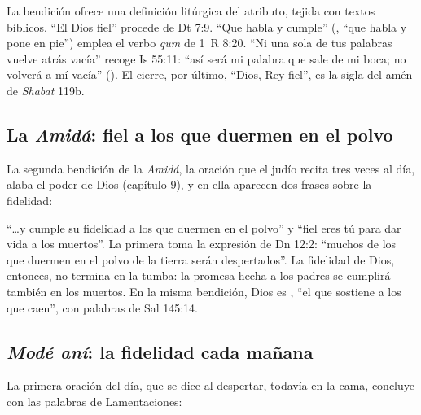 La bendición ofrece una definición litúrgica del atributo, tejida con textos bíblicos. ``El Dios fiel'' procede de Dt 7:9. ``Que habla y cumple'' (, ``que habla y pone en pie'') emplea el verbo \emph{qum} de 1~R 8:20. ``Ni una sola de tus palabras vuelve atrás vacía'' recoge Is 55:11: ``así será mi palabra que sale de mi boca; no volverá a mí vacía'' (). El cierre, por último, ``Dios, Rey fiel'', es la sigla del amén de \emph{Shabat} 119b.


\subsection{La \emph{Amidá}: fiel a los que duermen en el polvo}
La segunda bendición de la \emph{Amidá}, la oración que el judío recita tres veces al día, alaba el poder de Dios (capítulo 9), y en ella aparecen dos frases sobre la fidelidad:


``\ldots{}y cumple su fidelidad a los que duermen en el polvo'' y ``fiel eres tú para dar vida a los muertos''. La primera toma la expresión de Dn 12:2: ``muchos de los que duermen en el polvo de la tierra serán despertados''. La fidelidad de Dios, entonces, no termina en la tumba: la promesa hecha a los padres se cumplirá también en los muertos. En la misma bendición, Dios es , ``el que sostiene a los que caen'', con palabras de Sal 145:14.


\subsection{\emph{Modé aní}: la fidelidad cada mañana}
La primera oración del día, que se dice al despertar, todavía en la cama, concluye con las palabras de Lamentaciones:


